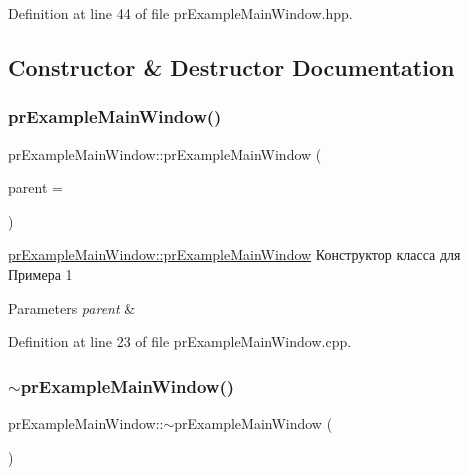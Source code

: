 Definition at line 44 of file pr\+Example\+Main\+Window.\+hpp.



\subsection{Constructor \& Destructor Documentation}
\mbox{\label{classpr_example_main_window_a7324b8ba9b5bc40a8895ac8971bc0192}} 
\subsubsection{\texorpdfstring{pr\+Example\+Main\+Window()}{prExampleMainWindow()}}
{\footnotesize\ttfamily pr\+Example\+Main\+Window\+::pr\+Example\+Main\+Window (\begin{DoxyParamCaption}\item[{Q\+Widget $\ast$}]{parent = {} }\end{DoxyParamCaption})\hspace{0.3cm}{\ttfamily [explicit]}}



\hyperlink{classpr_example_main_window_a7324b8ba9b5bc40a8895ac8971bc0192}{pr\+Example\+Main\+Window\+::pr\+Example\+Main\+Window} Конструктор класса для Примера 1 


\begin{DoxyParams}{Parameters}
{\em parent} & \\
\hline
\end{DoxyParams}


Definition at line 23 of file pr\+Example\+Main\+Window.\+cpp.

\mbox{\label{classpr_example_main_window_a0f04c65433b6de05dba55b26fb9fadba}} 
\subsubsection{\texorpdfstring{$\sim$pr\+Example\+Main\+Window()}{~prExampleMainWindow()}}
{\footnotesize\ttfamily pr\+Example\+Main\+Window\+::$\sim$pr\+Example\+Main\+Window (\begin{DoxyParamCaption}{ }\end{DoxyParamCaption})}



